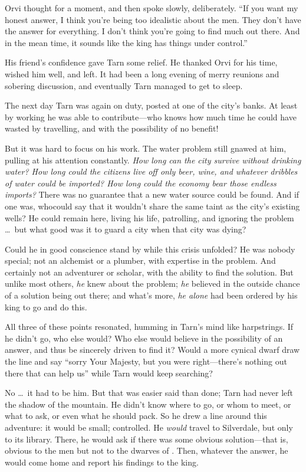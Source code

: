 Orvi thought for a moment, and then spoke slowly, deliberately.  ``If you want my honest answer, I think you're being too idealistic about the men.  They don't have the answer for everything.  I don't think you're going to find much out there.  And in the mean time, it sounds like the king has things under control.''

His friend's confidence gave Tarn some relief.  He thanked Orvi for his time, wished him well, and left.  It had been a long evening of merry reunions and sobering discussion, and eventually Tarn managed to get to sleep.

The next day Tarn was again on duty, posted at one of the city's banks.  At least by working he was able to contribute---who knows how much time he could have wasted by travelling, and with the possibility of no benefit!

But it was hard to focus on his work.  The water problem still gnawed at him, pulling at his attention constantly.  \emph{How long can the city survive without drinking water?  How long could the citizens live off only beer, wine, and whatever dribbles of water could be imported?  How long could the economy bear those endless imports?}  There was no guarantee that a new water source could be found.  And if one was, whocould say that it wouldn't share the same taint as the city's existing wells?  He could remain here, living his life, patrolling, and ignoring the problem \ldots\ but what good was it to guard a city when that city was dying?

Could he in good conscience stand by while this crisis unfolded?  He was nobody special; not an alchemist or a plumber, with expertise in the problem.  And certainly not an adventurer or scholar, with the ability to find the solution. But unlike most others, \emph{he} knew about the problem; \emph{he} believed in the outside chance of a solution being out there; and what's more, \emph{he alone} had been ordered by his king to go and do this.

All three of these points resonated, humming in Tarn's mind like harpstrings.  If he didn't go, who else would?  Who else would believe in the possibility of an answer, and thus be sincerely driven to find it?  Would a more cynical dwarf draw the line and say ``sorry Your Majesty, but you were right---there's nothing out there that can help us'' while Tarn would keep searching?

No \ldots\ it had to be him.  But that was easier said than done; Tarn had never left the shadow of the mountain.  He didn't know where to go, or whom to meet, or what to ask, or even what he should pack.  So he drew a line around this adventure: it would be small; controlled.  He \emph{would} travel to Silverdale, but only to its library.  There, he would ask if there was some obvious solution---that is, obvious to the men but not to the dwarves of \korbarthrond.  Then, whatever the answer, he would come home and report his findings to the king.

